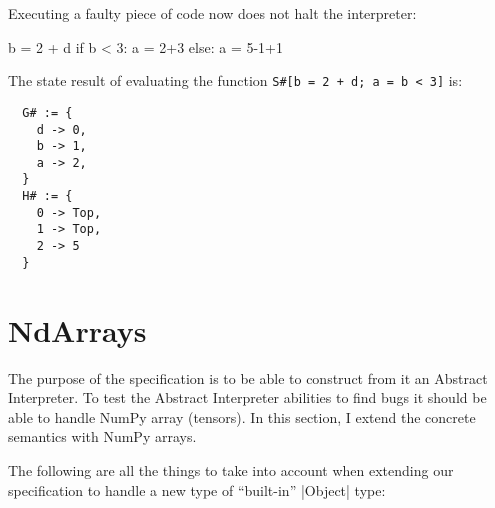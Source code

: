 Executing a faulty piece of code now does not halt the interpreter:

\begin{pythoncode}
b = 2 + d
if b < 3:
  a = 2+3
else:
  a = 5-1+1
\end{pythoncode}

The state result of evaluating the function \verb|S#[b = 2 + d; a = b < 3]| is:

\begin{verbatim}
  G# := {
    d -> 0,
    b -> 1,
    a -> 2,
  }
  H# := {
    0 -> Top,
    1 -> Top,
    2 -> 5
  }
\end{verbatim}

\section{NdArrays}

The purpose of the specification is to be able to construct from it an Abstract
Interpreter. To test the Abstract Interpreter abilities to find bugs it should be able to
handle NumPy array (tensors). In this section, I extend the concrete semantics with NumPy
arrays.

The following are all the things to take into account when extending our specification to
handle a new type of \enquote{built-in} \pycode|Object| type:

